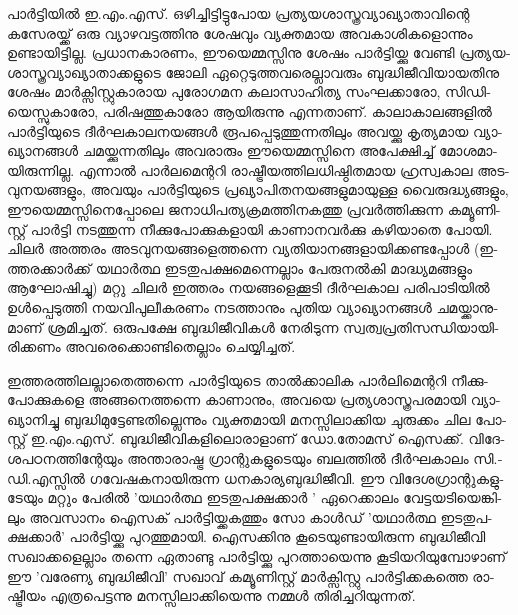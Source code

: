 ­പാര്‍­ട്ടി­യില്‍ ഇ.എം­.എ­സ്. ഒഴി­ച്ചി­ട്ടി­ട്ടു­പോയ പ്ര­ത്യ­യ­ശാ­സ്ത്ര­വ്യാ­ഖ്യാ­താ­വി­ന്റെ കസേ­ര­യ്ക്ക് ഒരു വ്യാ­ഴ­വ­ട്ട­ത്തി­നു ശേ­ഷ­വും 
വ്യ­ക്ത­മായ അവ­കാ­ശി­ക­ളൊ­ന്നും ഉണ്ടാ­യി­ട്ടി­ല്ല. പ്ര­ധാ­ന­കാ­ര­ണം, ഈയെ­മ്മ­സ്സി­നു ശേ­ഷം പാര്‍­ട്ടി­യ്ക്കു വേ­ണ്ടി 
പ്ര­ത്യ­യ­ശാ­സ്ത്ര­വ്യാ­ഖ്യാ­താ­ക്ക­ളു­ടെ ജോ­ലി ഏറ്റെ­ടു­ത്ത­വ­രെ­ല്ലാ­വ­രും ബു­ദ്ധി­ജീ­വി­യാ­യ­തി­നു ശേ­ഷം മാര്‍­ക്സി­സ്റ്റു­കാ­രായ 
പു­രോ­ഗ­മന കലാ­സാ­ഹി­ത്യ സം­ഘ­ക്കാ­രോ, സി­ഡി­യെ­സ്സു­കാ­രോ, പരി­ഷ­ത്തു­കാ­രോ ആയി­രു­ന്നു എന്ന­താ­ണ്. 
കാ­ലാ­കാ­ല­ങ്ങ­ളില്‍ പാര്‍­ട്ടി­യു­ടെ ദീര്‍­ഘ­കാ­ല­ന­യ­ങ്ങള്‍ രൂ­പ­പ്പെ­ടു­ത്തു­ന്ന­തി­ലും അവ­യ്ക്കു കൃ­ത്യ­മായ വ്യാ­ഖ്യാ­ന­ങ്ങള്‍ 
ചമ­യ്ക്കു­ന്ന­തി­ലും അവ­രാ­രും ഈയെ­മ്മ­സ്സി­നെ അപേ­ക്ഷി­ച്ച് മോ­ശ­മാ­യി­രു­ന്നി­ല്ല. എന്നാല്‍ പാര്‍­ല­മെ­ന്റ­റി 
രാ­ഷ്ട്രീ­യ­ത്തി­ല­ധി­ഷ്ഠി­ത­മായ ഹ്ര­സ്വ­കാല അട­വു­ന­യ­ങ്ങ­ളും, അവ­യും പാര്‍­ട്ടി­യു­ടെ പ്ര­ഖ്യാ­പി­ത­ന­യ­ങ്ങ­ളു­മാ­യു­ള്ള 
വൈ­രു­ദ്ധ്യ­ങ്ങ­ളും, ഈയെ­മ്മ­സ്സി­നെ­പ്പോ­ലെ ജനാ­ധി­പ­ത്യ­ക്ര­മ­ത്തി­ന­ക­ത്തു പ്ര­വര്‍­ത്തി­ക്കു­ന്ന കമ്യൂ­ണി­സ്റ്റ് പാര്‍­ട്ടി നട­ത്തു­ന്ന 
നീ­ക്കു­പോ­ക്കു­ക­ളാ­യി കാ­ണാ­ന­വര്‍­ക്കു കഴി­യാ­തെ പോ­യി. ചി­ലര്‍ അത്ത­രം അട­വു­ന­യ­ങ്ങ­ളെ­ത്ത­ന്നെ 
വ്യ­തി­യാ­ന­ങ്ങ­ളാ­യി­ക്ക­ണ്ട­പ്പോള്‍ (ഇ­ത്ത­ര­ക്കാര്‍­ക്ക് യഥാര്‍­ത്ഥ ഇട­തു­പ­ക്ഷ­മെ­ന്നെ­ല്ലാം പേ­രു­നല്‍­കി മാ­ദ്ധ്യ­മ­ങ്ങ­ളും 
ആഘോ­ഷി­ച്ചു) മറ്റു ചി­ലര്‍ ഇത്ത­രം നയ­ങ്ങ­ളെ­ക്കൂ­ടി ദീര്‍­ഘ­കാല പരി­പാ­ടി­യില്‍ ഉള്‍­പ്പെ­ടു­ത്തി നയ­വി­പു­ലീ­ക­ര­ണം നട­ത്താ­നും 
പു­തിയ വ്യാ­ഖ്യാ­ന­ങ്ങള്‍ ചമ­യ്ക്കാ­നു­മാ­ണ് ശ്ര­മി­ച്ച­ത്. ഒരു­പ­ക്ഷേ ബു­ദ്ധി­ജീ­വി­കള്‍ നേ­രി­ടു­ന്ന സ്വ­ത്വ­പ്ര­തി­സ­ന്ധി­യാ­യി­രി­ക്ക­ണം 
അവ­രെ­ക്കൊ­ണ്ടി­തെ­ല്ലാം ചെ­യ്യി­ച്ച­ത്.

ഇ­ത്ത­ര­ത്തി­ല­ല്ലാ­തെ­ത്ത­ന്നെ പാര്‍­ട്ടി­യു­ടെ താല്‍­ക്കാ­ലിക പാര്‍­ലി­മെ­ന്റ­റി നീ­ക്കു­പോ­ക്കു­ക­ളെ അങ്ങ­നെ­ത്ത­ന്നെ കാ­ണാ­നും,
അവ­യെ പ്ര­ത്യ­ശാ­സ്ത്ര­പ­ര­മാ­യി വ്യാ­ഖ്യാ­നി­ച്ചു ബു­ദ്ധി­മു­ട്ടേ­ണ്ട­തി­ല്ലെ­ന്നും വ്യ­ക്ത­മാ­യി മന­സ്സി­ലാ­ക്കിയ ചു­രു­ക്കം ചില പോ­സ്റ്റ്
ഇ.എം­.എ­സ്. ബു­ദ്ധി­ജീ­വി­ക­ളി­ലൊ­രാ­ളാ­ണ് ഡോ­.­തോ­മ­സ് ഐസ­ക്ക്. വി­ദേ­ശ­പ­ഠ­ന­ത്തി­ന്റേ­യും അന്താ­രാ­ഷ്ട്ര ഗ്രാ­ന്റു­ക­ളു­ടെ­യും
ബല­ത്തില്‍ ദീര്‍­ഘ­കാ­ലം സി­.­ഡി­.എ­സ്സില്‍ ഗവേ­ഷ­ക­നാ­യി­രു­ന്ന ധന­കാ­ര്യ­ബു­ദ്ധി­ജീ­വി. ഈ വി­ദേ­ശ­ഗ്രാ­ന്റു­ക­ളു­ടേ­യും മറ്റും 
പേ­രില്‍ 'യ­ഥാര്‍­ത്ഥ ഇട­തു­പ­ക്ഷ­ക്കാര്‍ ' ഏറെ­ക്കാ­ലം വേ­ട്ട­യ­ടി­യെ­ങ്കി­ലും അവ­സാ­നം ഐസ­ക് പാര്‍­ട്ടി­യ്ക്ക­ക­ത്തും സോ 
കാള്‍­ഡ് 'യ­ഥാര്‍­ത്ഥ ഇട­തു­പ­ക്ഷ­ക്കാര്‍' പാര്‍­ട്ടി­യ്ക്കു പു­റ­ത്തു­മാ­യി. ഐസ­ക്കി­നു കൂ­ടെ­യു­ണ്ടാ­യി­രു­ന്ന ബു­ദ്ധി­ജീ­വി 
സഖാ­ക്ക­ളെ­ല്ലാം തന്നെ ഏതാ­ണ്ടു പാര്‍­ട്ടി­യ്ക്കു പു­റ­ത്താ­യെ­ന്നു കൂ­ടി­യ­റി­യു­മ്പോ­ഴാ­ണ് ഈ 'വ­രേ­ണ്യ ബു­ദ്ധി­ജീ­വി' സഖാ­വ് 
കമ്യൂ­ണി­സ്റ്റ് മാര്‍­ക്സി­സ്റ്റു പാര്‍­ട്ടി­ക്ക­ക­ത്തെ രാ­ഷ്ട്രീ­യം എത്ര­പെ­ട്ട­ന്നു മന­സ്സി­ലാ­ക്കി­യെ­ന്നു നമ്മള്‍ തി­രി­ച്ച­റി­യു­ന്ന­ത്.

